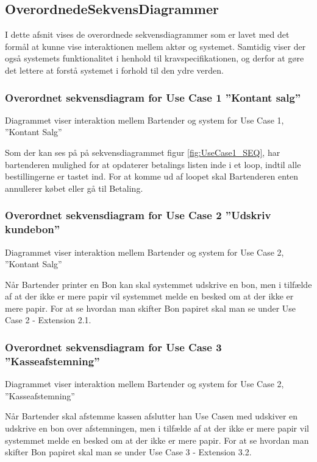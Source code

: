 
\subsection{OverordnedeSekvensDiagrammer}
I dette afsnit vises de overordnede sekvensdiagrammer som er lavet med det formål at kunne vise interaktionen mellem aktør og systemet. Samtidig viser der også systemets funktionalitet i henhold til kravspecifikationen, og derfor at gøre det lettere at forstå systemet i forhold til den ydre verden. 


\subsubsection{Overordnet sekvensdiagram for Use Case 1 ''Kontant salg''}
Diagrammet viser interaktion mellem Bartender og system for Use Case 1, ''Kontant Salg'' 


Som der kan ses på på sekvensdiagrammet figur \ref{fig:UseCase1_SEQ}, har bartenderen mulighed for at opdaterer betalings listen inde i et loop, indtil alle bestillingerne er tastet ind. For at komme ud af loopet skal Bartenderen enten annullerer købet eller gå til Betaling. 


\subsubsection{Overordnet sekvensdiagram for Use Case 2 ''Udskriv kundebon''}
Diagrammet viser interaktion mellem Bartender og system for Use Case 2, ''Kontant Salg'' 


Når Bartender printer en Bon kan skal systemmet udskrive en bon, men i tilfælde af at der ikke er mere papir vil systemmet melde en besked om at der ikke er mere papir.
\newline\newline
For at se hvordan man skifter Bon papiret skal man se under Use Case 2 - Extension 2.1.



\subsubsection{Overordnet sekvensdiagram for Use Case 3 ''Kasseafstemning''}
Diagrammet viser interaktion mellem Bartender og system for Use Case 2, ''Kasseafstemning'' 


Når Bartender skal afstemme kassen afslutter han Use Casen med udskiver en udskrive en bon over afstemningen, men i tilfælde af at der ikke er mere papir vil systemmet melde en besked om at der ikke er mere papir.
\newline\newline
For at se hvordan man skifter Bon papiret skal man se under Use Case 3 - Extension 3.2.
